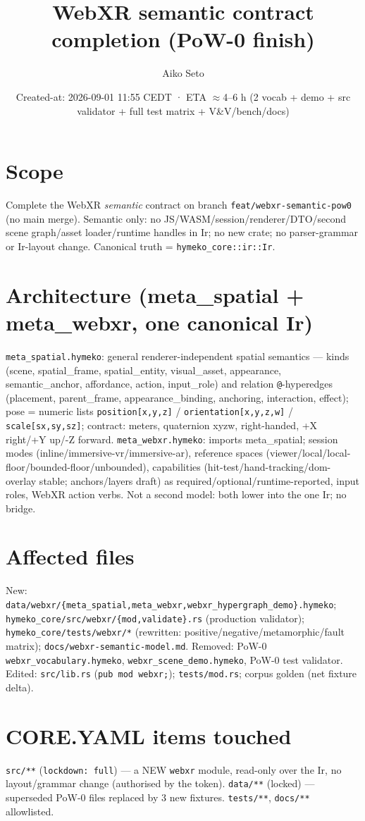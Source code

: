 \documentclass[11pt]{article}
\title{WebXR semantic contract completion (PoW-0 finish)}\author{Aiko Seto}
\date{Created-at: 2026-09-01 11:55 CEDT · ETA $\approx$4--6 h (2 vocab + demo + src validator + full test matrix + V\&V/bench/docs)}
\begin{document}
\maketitle
\section*{Scope}
Complete the WebXR \emph{semantic} contract on branch \texttt{feat/webxr-semantic-pow0} (no main merge).
Semantic only: no JS/WASM/session/renderer/DTO/second scene graph/asset loader/runtime handles in Ir;
no new crate; no parser-grammar or Ir-layout change. Canonical truth = \texttt{hymeko\_core::ir::Ir}.
\section*{Architecture (meta\_spatial + meta\_webxr, one canonical Ir)}
\texttt{meta\_spatial.hymeko}: general renderer-independent spatial semantics --- kinds
(scene, spatial\_frame, spatial\_entity, visual\_asset, appearance, semantic\_anchor, affordance, action,
input\_role) and relation \texttt{@}-hyperedges (placement, parent\_frame, appearance\_binding, anchoring,
interaction, effect); pose = numeric lists \texttt{position[x,y,z]} / \texttt{orientation[x,y,z,w]} /
\texttt{scale[sx,sy,sz]}; contract: meters, quaternion xyzw, right-handed, +X right/+Y up/-Z forward.
\texttt{meta\_webxr.hymeko}: imports meta\_spatial; session modes (inline/immersive-vr/immersive-ar),
reference spaces (viewer/local/local-floor/bounded-floor/unbounded), capabilities
(hit-test/hand-tracking/dom-overlay stable; anchors/layers draft) as required/optional/runtime-reported,
input roles, WebXR action verbs. Not a second model: both lower into the one Ir; no bridge.
\section*{Affected files}
New: \texttt{data/webxr/\{meta\_spatial,meta\_webxr,webxr\_hypergraph\_demo\}.hymeko};
\texttt{hymeko\_core/src/webxr/\{mod,validate\}.rs} (production validator); \texttt{hymeko\_core/tests/webxr/*}
(rewritten: positive/negative/metamorphic/fault matrix); \texttt{docs/webxr-semantic-model.md}.
Removed: PoW-0 \texttt{webxr\_vocabulary.hymeko}, \texttt{webxr\_scene\_demo.hymeko}, PoW-0 test validator.
Edited: \texttt{src/lib.rs} (\texttt{pub mod webxr;}); \texttt{tests/mod.rs}; corpus golden (net fixture delta).
\section*{CORE.YAML items touched}
\texttt{src/**} (\texttt{lockdown: full}) --- a NEW \texttt{webxr} module, read-only over the Ir, no
layout/grammar change (authorised by the token). \texttt{data/**} (locked) --- superseded PoW-0 files
replaced by 3 new fixtures. \texttt{tests/**}, \texttt{docs/**} allowlisted.
\end{document}
